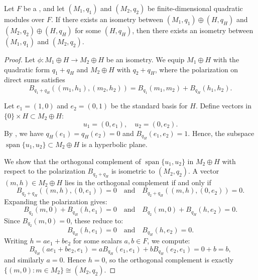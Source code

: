 \begin{proposition} \label{proposition:witt_cancellation_for_quadratic_forms_over_a_field}
    Let $F$ be a , and let $(M_1, q_1)$ and $(M_2, q_2)$ be finite-dimensional quadratic modules over $F$. If there exists an isometry between $(M_1, q_1) \oplus (H, q_H)$ and $(M_2, q_2) \oplus (H, q_H)$ for some  $(H, q_H)$, then there exists an isometry between $(M_1, q_1)$ and $(M_2, q_2)$.
\end{proposition}
\begin{proof}
    Let $\phi: M_1 \oplus H \to M_2 \oplus H$ be an isometry. We equip $M_1 \oplus H$ with the quadratic form $q_1 + q_H$ and $M_2 \oplus H$ with $q_2 + q_H$, where the polarization on direct sums satisfies
    $$B_{q_1+q_H}((m_1, h_1), (m_2, h_2)) = B_{q_1}(m_1, m_2) + B_{q_H}(h_1, h_2).$$

    Let $e_1 = (1,0)$ and $e_2 = (0,1)$ be the standard basis for $H$. Define vectors in $\{0\} \times H \subset M_2 \oplus H$:
    $$u_1 = (0, e_1), \quad u_2 = (0, e_2).$$
    By , we have $q_H(e_1) = q_H(e_2) = 0$ and $B_{q_H}(e_1,e_2) = 1$. Hence, the subspace $\operatorname{span}\{u_1, u_2\} \subset M_2 \oplus H$ is a hyperbolic plane.

    We show that the orthogonal complement of $\operatorname{span}\{u_1, u_2\}$ in $M_2 \oplus H$ with respect to the polarization $B_{q_2+q_H}$ is isometric to $(M_2, q_2)$. A vector $(m, h) \in M_2 \oplus H$ lies in the orthogonal complement if and only if
    $$B_{q_2+q_H}((m,h), (0,e_1)) = 0 \quad \text{and} \quad B_{q_2+q_H}((m,h), (0,e_2)) = 0.$$
    Expanding the polarization gives:
    $$B_{q_2}(m, 0) + B_{q_H}(h, e_1) = 0 \quad \text{and} \quad B_{q_2}(m, 0) + B_{q_H}(h, e_2) = 0.$$
    Since $B_{q_2}(m, 0) = 0$, these reduce to:
    $$B_{q_H}(h, e_1) = 0 \quad \text{and} \quad B_{q_H}(h, e_2) = 0.$$
    Writing $h = a e_1 + b e_2$ for some scalars $a, b \in F$, we compute:
    $$B_{q_H}(ae_1 + be_2, e_1) = a B_{q_H}(e_1, e_1) + b B_{q_H}(e_2, e_1) = 0 + b = b,$$
    and similarly $a = 0$. Hence $h = 0$, so the orthogonal complement is exactly $\{(m, 0) : m \in M_2\} \cong (M_2, q_2)$.


\end{proof}
